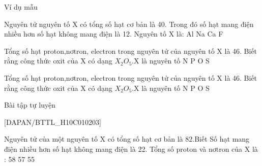 \begin{vdm}{Ví dụ mẫu}
\end{vdm}

\begin{vdex}[2]
	Nguyên tử nguyên tố X có tổng số hạt cơ bản là 40. Trong đó số hạt mang điện nhiều hơn số hạt không mang điện là 12. Nguyên tố X là:
	\choice
	{%
		\True	Al
	}
	{%
		Na
	}
	{%
		Ca
	}
	{%
		F
	}
	
\end{vdex}

\begin{vdex}[2]
	Tổng số hạt proton,nơtron, electron trong nguyên tử của nguyên tố X là 46. Biết rằng công thức oxit của X có dạng $ X_{2}O_{5} $.X là nguyên tố
	\choice
	{%
		N
	}
	{%
		\True	P
	}
	{%
		O
	}
	{%
		S
	}
	\huongdan{
	}
\end{vdex}


\begin{vdex}[2]
	Tổng số hạt proton,nơtron, electron trong nguyên tử của nguyên tố X là 46. Biết rằng công thức oxit của X có dạng $ X_{2}O_{5} $.X là nguyên tố
	\choice
	{%
		N
	}
	{%
		\True	P
	}
	{%
		O
	}
	{%
		S
	}
	\huongdan{
	}
\end{vdex}

\begin{bttl}{Bài tập tự luyện}
\end{bttl}
[DAPAN/BTTL_H10C010203]
\setcounter{tcb@cnt@exbox}{0}
\begin{ex}[2]
	Nguyên tử của một nguyên tố X có tổng số hạt cơ  bản là 82.Biết Số hạt mang điện nhiều hơn số hạt không mang điện là 22. Tổng số proton và nơtron của X là :
	\choice
	{%
		58
	}
	{%
		57
	}
	{%
	}
	{%
		55
	}
	
\end{ex}


